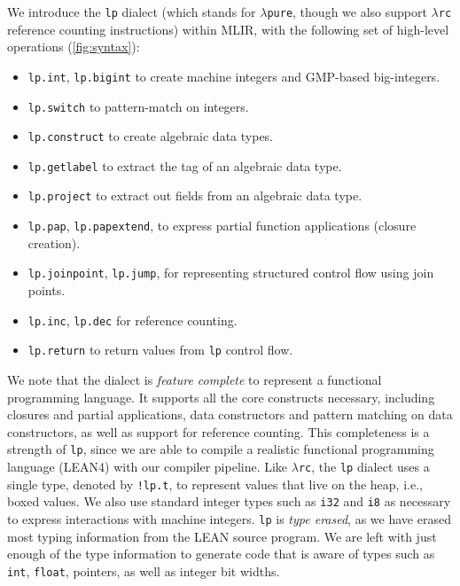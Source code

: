 \documentclass[conference]{IEEEtran}
\newcommand{\lpjump}{\textcolor{pairedTwoDarkBlue}{\texttt{lp.jump}}}
\newcommand{\lpjoinpoint}{\textcolor{pairedTwoDarkBlue}{\texttt{lp.joinpoint}}}
\newcommand{\lpswitch}{\textcolor{pairedTwoDarkBlue}{\texttt{lp.switch}}}
\newcommand{\lppap}{\textcolor{pairedTwoDarkBlue}{\texttt{lp.pap}}}
\newcommand{\lppapextend}{\textcolor{pairedTwoDarkBlue}{\texttt{lp.papextend}}}
\newcommand{\lpint}{\textcolor{pairedTwoDarkBlue}{\texttt{lp.int}}}
\newcommand{\lpbigint}{\textcolor{pairedTwoDarkBlue}{\texttt{lp.bigint}}}
\newcommand{\lp}{\textcolor{pairedTwoDarkBlue}{\texttt{lp}}}
\newcommand{\lpconstruct}{\textcolor{pairedTwoDarkBlue}{\texttt{lp.construct}}}
\newcommand{\lpgetlabel}{\textcolor{pairedTwoDarkBlue}{\texttt{lp.getlabel}}}
\newcommand{\lpproject}{\textcolor{pairedTwoDarkBlue}{\texttt{lp.project}}}
\newcommand{\lpinc}{\textcolor{pairedTwoDarkBlue}{\texttt{lp.inc}}}
\newcommand{\lpreturn}{\textcolor{pairedTwoDarkBlue}{\texttt{lp.return}}}
\newcommand{\lpdec}{\textcolor{pairedTwoDarkBlue}{\texttt{lp.dec}}}
\newcommand{\lambdapure}{\ensuremath{\lambda}\texttt{pure}}
\newcommand{\lambdarc}{\ensuremath{\lambda}\texttt{rc}}
\begin{document}
We introduce the \lp{} dialect (which stands for \lambdapure{}, though we also support \lambdarc{} reference counting instructions)
within MLIR, with the following set of high-level operations (\autoref{fig:syntax}):
\begin{itemize}
\item \lpint{}, \lpbigint{} to create machine integers and GMP-based big-integers.
\item \lpswitch{} to pattern-match on integers.
\item \lpconstruct{} to create algebraic data types.
\item \lpgetlabel{} to extract the tag of an algebraic data type.
\item \lpproject{} to extract out fields from an algebraic data type.
\item \lppap{}, \lppapextend{}, to express partial function applications (closure creation).
\item \lpjoinpoint{}, \lpjump{}, for representing structured control flow using join points.
\item \lpinc{}, \lpdec{} for reference counting.
\item \lpreturn{} to return values from \lp{} control flow.
\end{itemize}

We note that the dialect is \emph{feature complete} to represent a functional programming
language. It supports all the core constructs necessary, including closures and partial applications,
data constructors and pattern matching on data constructors, as well as support for reference counting.
This completeness is a strength of \lp{}, since we are able to compile a realistic functional
programming language (LEAN4) with our compiler pipeline. Like \lambdarc{}, the \lp{} dialect uses a
single type, denoted by \texttt{!lp.t}, to represent values that live on the heap, i.e., boxed values. We also use
standard integer types such as \texttt{i32} and \texttt{i8} as necessary to express interactions
with machine integers. \lp{} is \emph{type erased}, as we have erased most typing information from the
LEAN source program. We are left with just enough of the type information to generate code that is aware
of types such as \texttt{int}, \texttt{float}, pointers, as well as integer bit widths.
\end{document}
